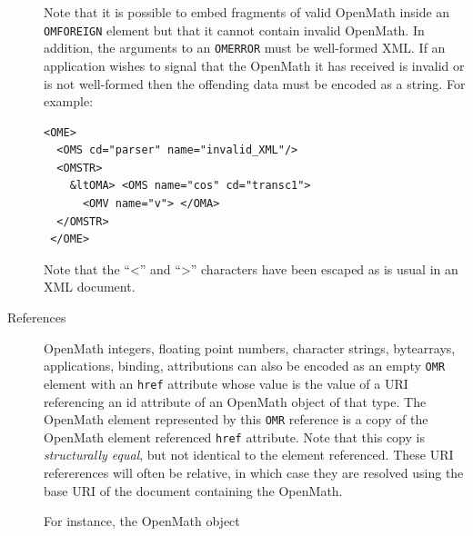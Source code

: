 \documentclass{report}
\def\textquote#1{``#1''}
\def\OM{OpenMath\xspace}
\def\XML{XML\xspace}
\begin{document}
\begin{description}
 Note that it is possible to embed fragments
of valid \OM inside an \lstinline|OMFOREIGN| element but that it
cannot contain invalid \OM.  In addition, the arguments to an
\lstinline|OMERROR| must be well-formed \XML.  If an
application wishes to signal that the \OM it has received is invalid or
is not well-formed then the offending data must be encoded as a string.
For example:
\begin{lstlisting}
<OME>
  <OMS cd="parser" name="invalid_XML"/>  
  <OMSTR>
    &ltOMA> <OMS name="cos" cd="transc1">
      <OMV name="v"> </OMA>
  </OMSTR> 
 </OME>
\end{lstlisting}
Note that the \textquote{<} and \textquote{>} characters have been escaped as is usual in
an \XML document.
\item[References] \OM integers, floating point numbers, character strings, bytearrays,
  applications, binding, attributions can also be encoded as an empty \lstinline|OMR|
  element with an \lstinline|href| attribute whose value is the value of a URI referencing
  an id attribute of an \OM object of that type.  The \OM element represented by this
  \lstinline|OMR| reference is a copy of the \OM element referenced \lstinline|href|
  attribute. Note that this copy is \emph{structurally equal}, but not identical to the
  element referenced. These URI refererences will often be relative, in which case they
  are resolved using the base URI of the document containing the \OM.

 For instance, the \OM object


\end{description}
\end{document}

